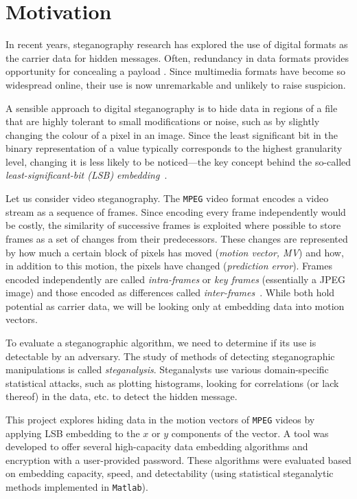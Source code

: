 \documentclass[12pt,british,twoside,notitlepage,usenames,dvipsnames,hypens,final]{report}
\numberwithin{equation}{section}
\numberwithin{figure}{section}
\begin{document}
\section{Motivation}
\label{motivation}

In recent years, steganography research has explored the use of digital formats as the carrier data for hidden messages. Often, redundancy in data formats provides opportunity for concealing a payload \cite[p.~2]{fridrich}. Since multimedia formats have become so widespread online, their use is now unremarkable and unlikely to raise suspicion.

A sensible approach to digital steganography is to hide data in regions of a file that are highly tolerant to small modifications or noise, such as by slightly changing the colour of a pixel in an image. Since the least significant bit in the binary representation of a value typically corresponds to the highest granularity level, changing it is less likely to be noticed---the key concept behind the so-called \emph{least-significant-bit (LSB) embedding}~\cite{bateman}\label{lsb-steg}. 

Let us consider video steganography. The \texttt{MPEG} video format encodes a video stream as a sequence of frames. Since encoding every frame independently would be costly, the similarity of successive frames is exploited where possible to store frames as a set of changes from their predecessors. These changes are represented by how much a certain block of pixels has moved (\emph{motion vector, MV}) and how, in addition to this motion, the pixels have changed (\emph{prediction error}). Frames encoded independently are called \emph{intra-frames} or \emph{key frames} (essentially a JPEG image) and those encoded as differences called \emph{inter-frames}~\cite{h264-std}. While both hold potential as carrier data, we will be looking only at embedding data into motion vectors.

To evaluate a steganographic algorithm, we need to determine if its use is detectable by an adversary. The study of methods of detecting steganographic manipulations is called \emph{steganalysis}. Steganalysts use various domain-specific statistical attacks, such as plotting histograms, looking for correlations (or lack thereof) in the data, etc. to detect the hidden message.

This project explores hiding data in the motion vectors of \texttt{MPEG} videos by applying LSB embedding to the $x$ or $y$ components of the vector. A tool was developed to offer several high-capacity data embedding algorithms and encryption with a user-provided password. These algorithms were evaluated based on embedding capacity, speed, and detectability (using statistical steganalytic methods implemented in \texttt{Matlab}).
\end{document}
